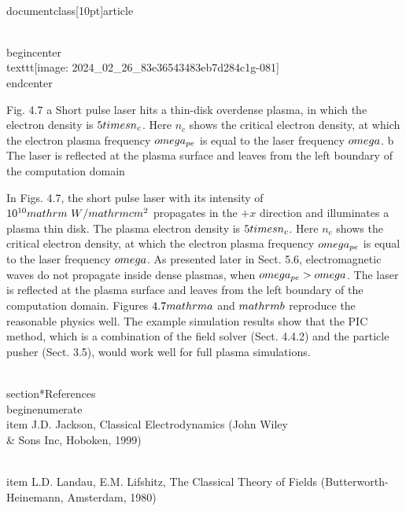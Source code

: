 \\documentclass[10pt]{article}
\begin{document}
\\begin{center}
\\texttt{[image: 2024\_02\_26\_83e36543483eb7d284c1g-081]}
\\end{center}

Fig. 4.7 a Short pulse laser hits a thin-disk overdense plasma, in which the electron density is $5 \\times n_{c}$. Here $n_{c}$ shows the critical electron density, at which the electron plasma frequency $\\omega_{p e}$ is equal to the laser frequency $\\omega$. b The laser is reflected at the plasma surface and leaves from the left boundary of the computation domain

In Figs. 4.7, the short pulse laser with its intensity of $10^{10} \\mathrm{~W} / \\mathrm{cm}^{2}$ propagates in the $+x$ direction and illuminates a plasma thin disk. The plasma electron density is $5 \\times n_{c}$. Here $n_{c}$ shows the critical electron density, at which the electron plasma frequency $\\omega_{p e}$ is equal to the laser frequency $\\omega$. As presented later in Sect. 5.6, electromagnetic waves do not propagate inside dense plasmas, when $\\omega_{p e}>\\omega$. The laser is reflected at the plasma surface and leaves from the left boundary of the computation domain. Figures $4.7 \\mathrm{a}$ and $\\mathrm{b}$ reproduce the reasonable physics well. The example simulation results show that the PIC method, which is a combination of the field solver (Sect. 4.4.2) and the particle pusher (Sect. 3.5), would work well for full plasma simulations.

\\section*{References}
\\begin{enumerate}
  \\item J.D. Jackson, Classical Electrodynamics (John Wiley \\& Sons Inc, Hoboken, 1999)

  \\item L.D. Landau, E.M. Lifshitz, The Classical Theory of Fields (Butterworth-Heinemann, Amsterdam, 1980)
\end{document}
